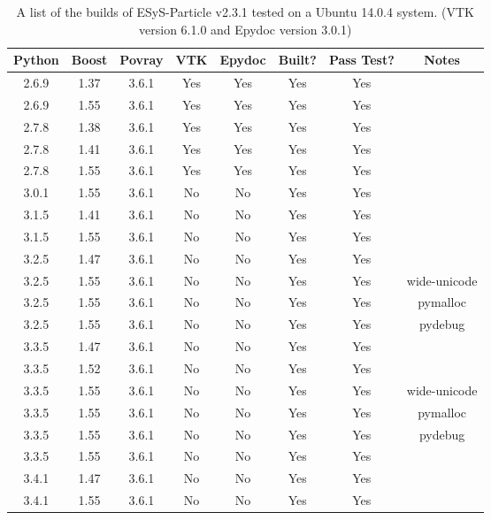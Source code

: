 \begin{table} [h]
    \centering
    \begin{tabular}{|c|c|c|c|c|c|c|c|}
    \hline
    Python & Boost & Povray & VTK & Epydoc & Built? & Pass Test? & Notes\\ \hline
    2.6.9  & 1.37  & 3.6.1  & Yes & Yes    & Yes    & Yes        & \\
    2.6.9  & 1.55  & 3.6.1  & Yes & Yes    & Yes    & Yes        & \\
    2.7.8  & 1.38  & 3.6.1  & Yes & Yes    & Yes    & Yes        & \\
    2.7.8  & 1.41  & 3.6.1  & Yes & Yes    & Yes    & Yes        & \\
    2.7.8  & 1.55  & 3.6.1  & Yes & Yes    & Yes    & Yes        & \\
    3.0.1  & 1.55  & 3.6.1  & No  & No     & Yes    & Yes        & \\
    3.1.5  & 1.41  & 3.6.1  & No  & No     & Yes    & Yes        & \\
    3.1.5  & 1.55  & 3.6.1  & No  & No     & Yes    & Yes        & \\
    3.2.5  & 1.47  & 3.6.1  & No  & No     & Yes    & Yes        & \\
    3.2.5  & 1.55  & 3.6.1  & No  & No     & Yes    & Yes        & wide-unicode\\
    3.2.5  & 1.55  & 3.6.1  & No  & No     & Yes    & Yes        & pymalloc \\
    3.2.5  & 1.55  & 3.6.1  & No  & No     & Yes    & Yes        & pydebug \\
    3.3.5  & 1.47  & 3.6.1  & No  & No     & Yes    & Yes        & \\
    3.3.5  & 1.52  & 3.6.1  & No  & No     & Yes    & Yes        & \\
    3.3.5  & 1.55  & 3.6.1  & No  & No     & Yes    & Yes        & wide-unicode\\
    3.3.5  & 1.55  & 3.6.1  & No  & No     & Yes    & Yes        & pymalloc \\
    3.3.5  & 1.55  & 3.6.1  & No  & No     & Yes    & Yes        & pydebug \\
    3.3.5  & 1.55  & 3.6.1  & No  & No     & Yes    & Yes        & \\
    3.4.1  & 1.47  & 3.6.1  & No  & No     & Yes    & Yes        & \\
    3.4.1  & 1.55  & 3.6.1  & No  & No     & Yes    & Yes        & \\ \hline
    \end{tabular}
    \caption{A list of the builds of ESyS-Particle v2.3.1 tested on a Ubuntu 14.0.4 system. (VTK version 6.1.0 and Epydoc version 3.0.1)}
\end{table}
   
